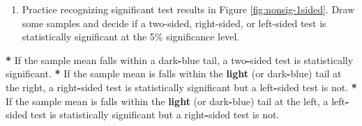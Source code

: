 \documentclass[a4paper]{book}
\newenvironment{Shaded}{\begin{snugshade}}{\end{snugshade}}
\newcommand{\KeywordTok}[1]{\textcolor[rgb]{0,0,0}{\textbf{#1}}}
\newcommand{\DecValTok}[1]{\textcolor[rgb]{0.00,0.00,0.00}{#1}}
\newcommand{\FloatTok}[1]{\textcolor[rgb]{0.00,0.00,0.00}{#1}}
\newcommand{\StringTok}[1]{\textcolor[rgb]{0.00,0.00,0.00}{#1}}
\newcommand{\ControlFlowTok}[1]{\textcolor[rgb]{0.00,0.00,0.00}{\textbf{#1}}}
\newcommand{\OperatorTok}[1]{\textcolor[rgb]{0.00,0.00,0.00}{\textbf{#1}}}
\newcommand{\NormalTok}[1]{#1}
\providecommand{\tightlist}{%
  \setlength{\itemsep}{0pt}\setlength{\parskip}{0pt}}
\theoremstyle{definition}
\theoremstyle{definition}
\theoremstyle{definition}
\theoremstyle{remark}
\begin{document}
\begin{Shaded}
\end{Shaded}

\begin{enumerate}
\def\labelenumi{\arabic{enumi}.}
\setcounter{enumi}{1}
\tightlist
\item
  Practice recognizing significant test results in Figure
  \ref{fig:nonsig-1sided}. Draw some samples and decide if a two-sided,
  right-sided, or left-sided test is statistically significant at the
  5\% significance level.
\end{enumerate}

\begin{Shaded}
\begin{Highlighting}[]
\OperatorTok{*}\StringTok{ }\NormalTok{If the sample mean falls within a dark}\OperatorTok{-}\NormalTok{blue tail, a two}\OperatorTok{-}\NormalTok{sided test is}
\NormalTok{statistically significant.}
\OperatorTok{*}\StringTok{ }\NormalTok{If the sample mean is falls within the }\KeywordTok{light}\NormalTok{ (or dark}\OperatorTok{-}\NormalTok{blue) tail at the}
\NormalTok{right, a right}\OperatorTok{-}\NormalTok{sided test is statistically significant but a left}\OperatorTok{-}\NormalTok{sided test}
\NormalTok{is not.}
\OperatorTok{*}\StringTok{ }\NormalTok{If the sample mean is falls within the }\KeywordTok{light}\NormalTok{ (or dark}\OperatorTok{-}\NormalTok{blue) tail at the}
\NormalTok{left, a left}\OperatorTok{-}\NormalTok{sided test is statistically significant but a right}\OperatorTok{-}\NormalTok{sided test is}
\NormalTok{not.}
\end{Highlighting}
\end{Shaded}
\end{document}
